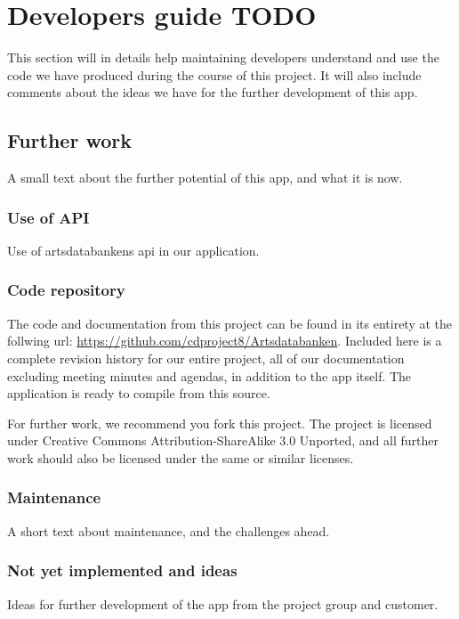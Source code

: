 \section{Developers guide TODO}
This section will in details help maintaining developers understand and use the code we have produced during the course of this project. It will also include comments about the ideas we have for the further development of this app.

\subsection{Further work}
A small text about the further potential of this app, and what it is now.
\subsubsection{Use of API}
Use of artsdatabankens api in our application.

\subsubsection{Code repository}
The code and documentation from this project can be found in its entirety at the follwing url: \url{https://github.com/cdproject8/Artsdatabanken}. Included here is a complete revision history for our entire project, all of our documentation excluding meeting minutes and agendas, in addition to the app itself. The application is ready to compile from this source.

For further work, we recommend you fork this project. The project is licensed under Creative Commons Attribution-ShareAlike 3.0 Unported, and all further work should also be licensed under the same or similar licenses.

\subsubsection{Maintenance}
A short text about maintenance, and the challenges ahead.

\subsubsection{Not yet implemented and ideas}
Ideas for further development of the app from the project group and customer.

